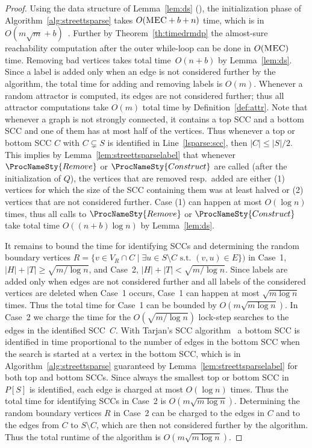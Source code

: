 \documentclass[11pt,letterpaper]{article}
\newcommand{\set}[1]{\{#1\}}
\newcommand{\lu}{\textup{(}}
\newcommand{\ru}{\textup{)}\xspace}
\newcommand{\upbr}[1]{\lu #1\ru}
\newcommand{\mdp}{P\xspace}
\newcommand{\vr}{V_R\xspace}
\newcommand{\scc}{C\xspace}
\newcommand{\remove}{\ProcNameSty{Remove}}
\newcommand{\construct}{\ProcNameSty{Construct}}
\begin{document}
\begin{proof}
	Using the data structure of Lemma~\ref{lem:ds} (\cite{HenzingerT96}),
	the initialization phase of Algorithm~\ref{alg:streettsparse} takes
	$O(\textsc{MEC} + b + n)$ time, which is in $O(m\sqrt{m} + b)$~\cite{ChatterjeeH14}.
	Further by Theorem~\ref{th:timedrmdp} the almost-sure reachability computation
	after the outer while-loop can be done in $O(\textsc{MEC})$ time. 
	Removing bad vertices takes total time~$O(n + b)$ by Lemma~\ref{lem:ds}. 
	Since a label is added only when an edge is not considered further by the 
	algorithm, the total time for adding and removing labels is $O(m)$.
	Whenever a random attractor is computed, its edges are not considered further;
	thus all attractor computations take $O(m)$ total time by Definition~\ref{def:attr}.
	Note that whenever a graph is not strongly connected, it contains a top SCC and 
	a bottom SCC and one of them has at most half of the vertices. Thus whenever 
	a top or bottom SCC $\scc$ with $\scc \subsetneq S$ is identified in 
	Line~\ref{lsparse:scc}, then $\lvert \scc \rvert \le \lvert S \rvert / 2$.
	This implies by Lemma~\ref{lem:streettsparselabel}
	that whenever $\remove$ or $\construct$ are called (after the
	initialization of $Q$), the vertices that are removed resp.\ added are either
	\upbr{1} vertices for which the size of the SCC containing them was at least halved
	or \upbr{2} vertices that are not considered further. Case \upbr{1} can happen
	at most $O(\log n)$ times, thus all calls to $\remove$ or $\construct$ take
	total time $O((n+b)\log n)$ by Lemma~\ref{lem:ds}.
	
	It remains to bound the time for identifying SCCs and determining the
	random boundary vertices $R =  \set{v \in \vr \cap \scc \mid 
			\exists u \in S \setminus \scc \text{ s.t.\ } (v, u) \in E})$ in
	Case~1, $\lvert H \rvert + \lvert T \rvert \ge \sqrt{m / \log n}$,
	and Case~2, $\lvert H \rvert + \lvert T \rvert < \sqrt{m / \log n}$.
	Since labels are added only when edges are not considered further and all 
	labels of the considered vertices are deleted when Case~1 occurs, Case~1 can 
	happen at most $\sqrt{m \log n}$ times. Thus the total time for Case~1 can be 
	bounded by $O(m \sqrt{m \log n})$. In Case~2 we charge the time for the 
	$O(\sqrt{m / \log n})$ lock-step searches to the edges in the identified 
	SCC~$\scc$. With Tarjan's SCC algorithm~\cite{T72} a bottom SCC is identified 
	in time proportional to the number of edges in the bottom SCC when the search
	is started at a vertex in the bottom SCC, which is in 
	Algorithm~\ref{alg:streettsparse} guaranteed by Lemma~\ref{lem:streettsparselabel}
	for both top and bottom SCCs. Since always the smallest top or bottom SCC in 
	$\mdp[S]$ is identified, each edge is charged at most $O(\log n)$ times.
	Thus the total time for identifying SCCs in Case~2 is $O(m \sqrt{m \log n})$.
	Determining the random boundary vertices $R$ in Case~2 can be charged to 
	the edges in $\scc$
	and to the edges from $\scc$ to $S \setminus \scc$, which are then not considered 
	further by the algorithm. Thus the total runtime of the algorithm is 
	$O(m \sqrt{m \log n})$.
\end{proof}
\end{document}
